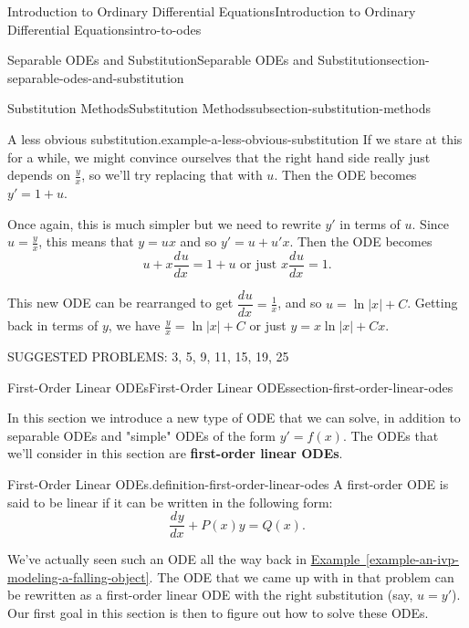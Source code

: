\documentclass[oneside,10pt,]{book}
\newcommand{\terminology}[1]{\textbf{#1}}
\numberwithin{equation}{section}
\newcommand{\dv}[3][]{\dfrac{d^{#1} #2}{d #3^{#1}}}
\begin{document}
\begin{chapterptx}{Introduction to Ordinary Differential Equations}{}{Introduction to Ordinary Differential Equations}{}{}{intro-to-odes}
\begin{sectionptx}{Separable ODEs and Substitution}{}{Separable ODEs and Substitution}{}{}{section-separable-odes-and-substitution}
\begin{subsectionptx}{Substitution Methods}{}{Substitution Methods}{}{}{subsection-substitution-methods}
\begin{example}{A less obvious substitution.}{example-a-less-obvious-substitution}
If we stare at this for a while, we might convince ourselves that the right hand side really just depends on \(\frac{y}{x}\), so we'll try replacing that with \(u\). Then the ODE becomes \(y'=1+u\).%
\par
\hypertarget{p-68}{}%
Once again, this is much simpler but we need to rewrite \(y'\) in terms of \(u\). Since \(u=\frac{y}{x}\), this means that \(y=ux\) and so \(y' = u+u'x\). Then the ODE becomes%
\begin{equation*}
u+x\dv{u}{x} = 1+u\text{ or just } x\dv{u}{x} = 1\text{.}
\end{equation*}
%
\par
\hypertarget{p-69}{}%
This new ODE can be rearranged to get \(\dv{u}{x} = \frac{1}{x}\), and so \(u = \ln|x|+C\). Getting back in terms of \(y\), we have \(\frac{y}{x} = \ln|x|+C\) or just \(y = x\ln|x|+Cx\).%
\end{example}
\end{subsectionptx}
\begin{conclusion}{}%
\hypertarget{p-70}{}%
SUGGESTED PROBLEMS: 3, 5, 9, 11, 15, 19, 25%
\end{conclusion}%
\end{sectionptx}
%
%
\typeout{************************************************}
\typeout{************************************************}
%
\begin{sectionptx}{First-Order Linear ODEs}{}{First-Order Linear ODEs}{}{}{section-first-order-linear-odes}
\begin{introduction}{}%
\hypertarget{p-71}{}%
In this section we introduce a new type of ODE that we can solve, in addition to separable ODEs and "simple" ODEs of the form \(y'=f(x)\). The ODEs that we'll consider in this section are \terminology{first-order linear ODEs}.%
\begin{definition}{First-Order Linear ODEs.}{definition-first-order-linear-odes}%
\hypertarget{p-72}{}%
A first-order ODE is said to be linear if it can be written in the following form:%
\begin{equation*}
\dv{y}{x} + P(x)y = Q(x).
\end{equation*}
%
\end{definition}
\hypertarget{p-73}{}%
We've actually seen such an ODE all the way back in \hyperref[example-an-ivp-modeling-a-falling-object]{Example~\ref{example-an-ivp-modeling-a-falling-object}}. The ODE that we came up with in that problem can be rewritten as a first-order linear ODE with the right substitution (say, \(u = y'\)). Our first goal in this section is then to figure out how to solve these ODEs.%

\end{introduction}
\end{sectionptx}
\end{chapterptx}
\end{document}
